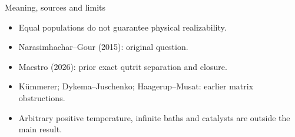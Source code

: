 \documentclass{beamer}
\begin{document}
\begin{frame}{Meaning, sources and limits}
\begin{itemize}
 \item Equal populations do not guarantee physical realizability.
 \item Narasimhachar--Gour (2015): original question.
 \item Maestro (2026): prior exact qutrit separation and closure.
 \item Kümmerer; Dykema--Juschenko; Haagerup--Musat: earlier matrix obstructions.
 \item Arbitrary positive temperature, infinite baths and catalysts are outside the main result.
 \end{itemize}
\end{frame}
\appendix
\end{document}
